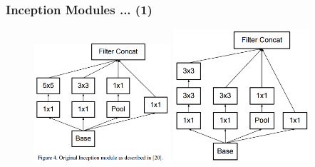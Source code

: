 \documentclass[9pt]{beamer}
\begin{document}
\begin{frame}
	\frametitle{Inception Modules ... (1)}
	\begin{figure}
		\includegraphics[width=0.45\textwidth]{./figures/edit/inception_org.png}
		\hspace{0.05\textwidth} 
		\includegraphics[width=0.45\textwidth]{./figures/edit/breakdown_01.png}
	\end{figure}
\end{frame}
\end{document}
